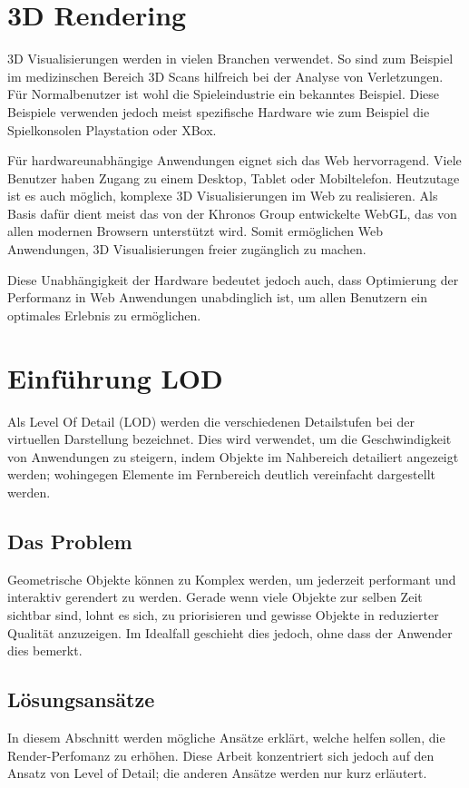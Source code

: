 \section{3D Rendering}
3D Visualisierungen werden in vielen Branchen verwendet.
So sind zum Beispiel im medizinschen Bereich 3D Scans hilfreich bei der Analyse von Verletzungen.
Für Normalbenutzer ist wohl die Spieleindustrie ein bekanntes Beispiel.
Diese Beispiele verwenden jedoch meist spezifische Hardware wie zum Beispiel die Spielkonsolen Playstation oder XBox.

Für hardwareunabhängige Anwendungen eignet sich das Web hervorragend. Viele Benutzer haben Zugang zu einem Desktop, Tablet oder Mobiltelefon.
Heutzutage ist es auch möglich, komplexe 3D Visualisierungen im Web zu realisieren.
Als Basis dafür dient meist das von der Khronos Group entwickelte WebGL, das von allen modernen Browsern unterstützt wird.
Somit ermöglichen Web Anwendungen, 3D Visualisierungen freier zugänglich zu machen.

Diese Unabhängigkeit der Hardware bedeutet jedoch auch, dass Optimierung der Performanz in Web Anwendungen unabdinglich ist, um allen Benutzern ein optimales Erlebnis zu ermöglichen.

\section{Einführung LOD}
Als Level Of Detail (LOD) werden die verschiedenen Detailstufen bei der virtuellen Darstellung bezeichnet.
Dies wird verwendet, um die Geschwindigkeit von Anwendungen zu steigern, indem Objekte im Nahbereich detailiert angezeigt werden; wohingegen Elemente im Fernbereich deutlich vereinfacht dargestellt werden.

\subsection{Das Problem}
Geometrische Objekte können zu Komplex werden, um jederzeit performant und interaktiv gerendert zu werden.
Gerade wenn viele Objekte zur selben Zeit sichtbar sind, lohnt es sich, zu priorisieren und gewisse Objekte in reduzierter Qualität anzuzeigen.
Im Idealfall geschieht dies jedoch, ohne dass der Anwender dies bemerkt.

\subsection{Lösungsansätze}
In diesem Abschnitt werden mögliche Ansätze erklärt, welche helfen sollen, die Render-Perfomanz zu erhöhen. Diese Arbeit konzentriert sich jedoch auf den Ansatz von Level of Detail; die anderen Ansätze werden nur kurz erläutert.

